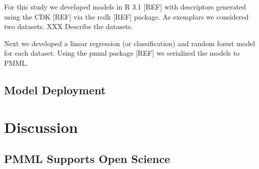 \documentclass[12pt,letterpaper]{article}
\begin{document}
For this study we developed models in R 3.1 [REF] with descriptors
generated using the CDK [REF] via the rcdk [REF] package. As exemplars
we considered two datasets. XXX Describe the datasets.

Next we developed a linear regression (or classification) and random
forest  model  for each dataset. Using the pmml package [REF] we
serialized the models to PMML.

\subsection{Model Deployment}
\label{sec:model-deployment}


\section{Discussion}
\label{sec:discussion}

\subsection{PMML Supports Open Science}
\label{sec:pmml-supports-open}
\end{document}
